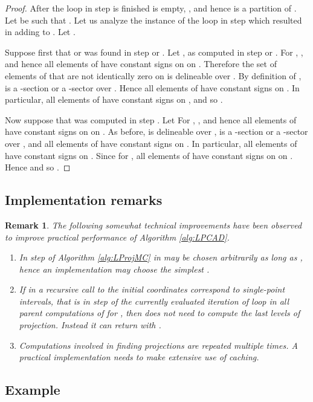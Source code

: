 \documentclass[english]{amsart}
\numberwithin{equation}{section}
\numberwithin{figure}{section}
\newtheorem{rem}[thm]{Remark}
\begin{document}
\begin{proof}
After the loop in step  is finished  is empty, ,
and hence  is a partition of . Let
 be such that .
Let us analyze the instance of the loop in step  which resulted
in adding  to . Let . 

Suppose first that  or  was found in step 
or . Let , as computed
in step  or . For , ,
and hence all elements of  have constant signs on on .
Therefore the set  of elements of  that are
not identically zero on  is delineable over .
By definition of ,  is a -section or a -sector
over . Hence all elements of  have constant signs on
. In particular, all elements of  have constant signs on ,
and so . 

Now suppose that  was computed in step
. Let 
For , , and hence all elements
of  have constant signs on on . As before, 
is delineable over ,  is a -section or a -sector
over , and all elements of  have constant signs on .
In particular, all elements of  have constant signs on .
Since for  , all elements of
 have constant signs on on . Hence
and so .
\end{proof}

\subsection{Implementation remarks}
\begin{rem}
\label{rem:Zdim}The following somewhat technical improvements have
been observed to improve practical performance of Algorithm \ref{alg:LPCAD}.
\begin{enumerate}
\item In step  of Algorithm \ref{alg:LProjMC} in  may be
chosen arbitrarily as long as , hence an
implementation may choose the simplest .
\item If in a recursive call to  the initial
coordinates  correspond to single-point intervals,
that is  in step  of the currently evaluated
iteration of loop  in all parent computations of 
 for , then 
does not need to compute the last  levels of projection. Instead
it can return  with .
\item Computations involved in finding projections are repeated multiple
times. A practical implementation needs to make extensive use of caching.
\end{enumerate}
\end{rem}

\subsection{\label{sub:Example}Example}
\end{document}
